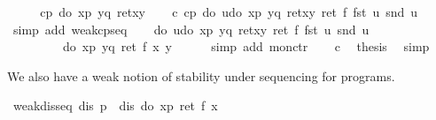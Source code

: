 \begin{isabellebody}
\isamarkupfalse%
\ {\isacharminus}\isanewline
\ \ \isamarkupfalse%
\ {\isachardoublequote}cp\ {\isacharparenleft}do\ {\isacharbraceleft}x{\isasymleftarrow}p{\isacharsemicolon}\ y{\isasymleftarrow}q{\isacharsemicolon}\ ret{\isacharparenleft}x{\isacharcomma}y{\isacharparenright}{\isacharbraceright}{\isacharparenright}{\isachardoublequote}\isanewline
\ \ \isamarkupfalse%
\ c{\isacharcolon}\ {\isachardoublequote}cp\ {\isacharparenleft}do\ {\isacharbraceleft}u{\isasymleftarrow}do\ {\isacharbraceleft}x{\isasymleftarrow}p{\isacharsemicolon}\ y{\isasymleftarrow}q{\isacharsemicolon}\ ret{\isacharparenleft}x{\isacharcomma}y{\isacharparenright}{\isacharbraceright}{\isacharsemicolon}\ ret\ {\isacharparenleft}f\ {\isacharparenleft}fst\ u{\isacharparenright}\ {\isacharparenleft}snd\ u{\isacharparenright}{\isacharparenright}{\isacharbraceright}{\isacharparenright}{\isachardoublequote}\ \isanewline
\ \ \ \ \isamarkupfalse%
\ {\isacharparenleft}simp\ add{\isacharcolon}\ weak{\isacharunderscore}cp{\isacharunderscore}seq{\isacharparenright}\isanewline
\ \ \isamarkupfalse%
\ {\isachardoublequote}do\ {\isacharbraceleft}u{\isasymleftarrow}do\ {\isacharbraceleft}x{\isasymleftarrow}p{\isacharsemicolon}\ y{\isasymleftarrow}q{\isacharsemicolon}\ ret{\isacharparenleft}x{\isacharcomma}y{\isacharparenright}{\isacharbraceright}{\isacharsemicolon}\ ret\ {\isacharparenleft}f\ {\isacharparenleft}fst\ u{\isacharparenright}\ {\isacharparenleft}snd\ u{\isacharparenright}{\isacharparenright}{\isacharbraceright}\isanewline
\ \ \ \ \ \ \ \ {\isacharequal}\ do\ {\isacharbraceleft}x{\isasymleftarrow}p{\isacharsemicolon}\ y{\isasymleftarrow}q{\isacharsemicolon}\ ret\ {\isacharparenleft}f\ x\ y{\isacharparenright}{\isacharbraceright}{\isachardoublequote}\isanewline
\ \ \ \ \isamarkupfalse%
\ {\isacharparenleft}simp\ add{\isacharcolon}\ mon{\isacharunderscore}ctr{\isacharparenright}\isanewline
\ \ \isamarkupfalse%
\ c\ \isamarkupfalse%
\ {\isacharquery}thesis\ \isamarkupfalse%
\ simp\isanewline
\isamarkupfalse%
\isamarkupfalse%
%
\begin{isamarkuptext}%
We also have a weak notion of stability under sequencing for 
  programs.%
\end{isamarkuptext}%
\isamarkuptrue%
\ weak{\isacharunderscore}dis{\isacharunderscore}seq{\isacharcolon}\ {\isachardoublequote}dis\ p\ {\isasymLongrightarrow}\ dis\ {\isacharparenleft}do\ {\isacharbraceleft}x{\isasymleftarrow}p{\isacharsemicolon}\ ret\ {\isacharparenleft}f\ x{\isacharparenright}{\isacharbraceright}{\isacharparenright}{\isachardoublequote}\isanewline

\end{isabellebody}
